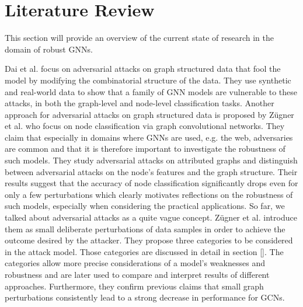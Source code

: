 \documentclass[a4paper,preprint]{sig-alternate}
\begin{document}
\section{Literature Review}
\label{sec:literature}

This section will provide an overview of the current state of research in the domain of robust GNNs.\newline

Dai et al. \cite{dai2018adversarial} focus on adversarial attacks on graph structured data that fool the model by modifying the
combinatorial structure of the data. They use synthetic and real-world data to show that a family of GNN models are vulnerable
to these attacks, in both the graph-level and node-level classification tasks.\newline
Another approach for adversarial attacks on graph structured data is proposed by Zügner et al. \cite{Z_gner_2018} who focus on node classification
via graph convolutional networks.
They claim that especially in domains where GNNs are used, e.g. the web, adversaries are common and that it is therefore important
to investigate the robustness of such models. They study adversarial attacks on attributed graphs and distinguish between
adversarial attacks on the node's features and the graph structure. Their results suggest that the accuracy of node classification
significantly drops even for only a few perturbations which clearly motivates reflections on the robustness of such models, especially
when considering the practical applications.\newline
So far, we talked about adversarial attacks as a quite vague concept. Zügner et al. \cite{zuegner2019adversarial}
introduce them as small deliberate perturbations of data samples in order to achieve the outcome desired by the attacker.
They propose three categories to be considered in the attack model. Those categories are discussed in detail in section \ref{}.
The categories allow more precise considerations of a model's weaknesses and robustness and are later used to compare and interpret results of 
different approaches. Furthermore, they confirm previous claims that small graph perturbations consistently lead to a strong decrease 
in performance for GCNs.\newline
\end{document}
